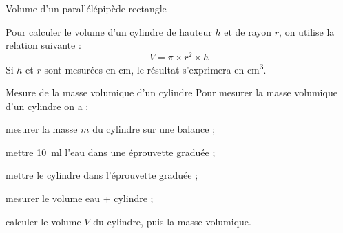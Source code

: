 \begin{doc}{Volume d'un parallélépipède rectangle}
  \begin{multicols}{2}

  
    Pour calculer le volume d'un cylindre de hauteur $h$ et de rayon $r$, on utilise la relation suivante :
    \begin{equation*}
      V = \pi \times r^2 \times h
    \end{equation*}
    Si $h$ et $r$ sont mesurées en \unit{\cm},
    le résultat s’exprimera en \unit{\cubic\cm}.
  
    \centering
  \end{multicols}
\end{doc}

\begin{doc}{Mesure de la masse volumique d'un cylindre}
  Pour mesurer la masse volumique d'un cylindre on a :
  \begin{protocole}
    \item mesurer la masse $m$ du cylindre sur une balance ;
    \item mettre \qty{10}{\ml} l'eau dans une éprouvette graduée ;
    \item mettre le cylindre dans l'éprouvette graduée ;
    \item mesurer le volume eau + cylindre ;
    \item calculer le volume $V$ du cylindre, puis la masse volumique.
  \end{protocole}
\end{doc}


